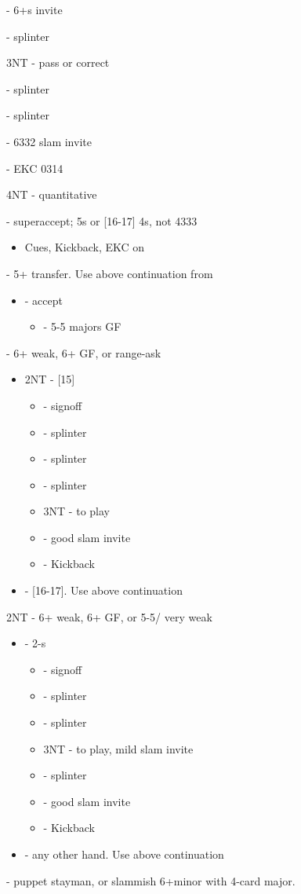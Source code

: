 \documentclass[12pt]{report}
\newcommand{\ul}[1]{\begin{itemize}#1\end{itemize}}
\newcommand{\li}{\item[~]}
\begin{document}
{{{                \li {} - 6+\he{}s invite
                \li {} - splinter
                \li 3NT - pass or correct
                \li {} - splinter
                \li {} - splinter
                \li {} - 6332 slam invite
                \li {} - EKC 0314
                \li 4NT - quantitative
            }
            \li {} - superaccept; 5\he{}s or [16-17] 4\he{}s, not 4333
            \ul {
                \li Cues, Kickback, EKC on
            }
        }

        \li {} - 5+\sp{} transfer. Use above continuation from 
        \ul {
            \li {} - accept
            \ul {
                \li \he3 - 5-5 majors GF
            }
        }

        \li {} - 6+\cl{} weak, 6+\cl{} GF, or range-ask
        \ul {
            \li 2NT - [15]
            \ul {
                \li \cl3 - signoff
                \li \di3 - splinter
                \li \he3 - splinter
                \li \sp3 - splinter
                \li 3NT - to play
                \li \cl4 - good slam invite
                \li \di4 - Kickback
            }
            \li \cl3 - [16-17]. Use above continuation
        }

        \li 2NT - 6+\di{} weak, 6+\di{} GF, or 5-5\cl{}/\di{} very weak
        \ul {
            \li {} - 2-\di{}s
            \ul {
                \li \di3 - signoff
                \li \he3 - splinter
                \li \sp3 - splinter
                \li 3NT - to play, mild slam invite
                \li \cl4 - splinter
                \li \di4 - good slam invite
                \li \he4 - Kickback
            }
            \li \di3 - any other hand. Use above continuation
        }

        \li {} - puppet stayman, or slammish 6+minor with 4-card major.

}
\end{document}
